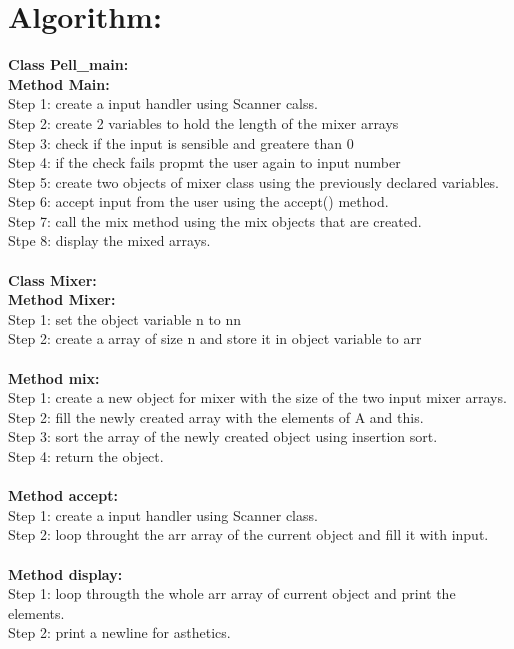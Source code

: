 \section*{Algorithm:}
\textbf{\color{javapurple}Class Pell\_main:}\\
\textbf{Method Main:}\\
Step 1: create a input handler using Scanner calss.\\
Step 2: create 2 variables to hold the length of the mixer arrays\\
Step 3: check if the input is sensible and greatere than 0\\
Step 4: if the check fails propmt the user again to input number\\
Step 5: create two objects of mixer class using the previously declared variables.\\
Step 6: accept input from the user using the accept() method.\\
Step 7: call the mix method using the mix objects that are created.\\
Stpe 8: display the mixed arrays.\\\\
\textbf{\color{javapurple}Class Mixer:}\\
\textbf{Method Mixer:}\\
Step 1: set the object variable n to nn \\
Step 2: create a array of size n and store it in object variable to arr\\\\
\textbf{Method mix:}\\
Step 1: create a new object for mixer with the size of the two input mixer arrays.\\
Step 2: fill the newly created array with the elements of A and this.\\
Step 3: sort the array of the newly created object using insertion sort.\\
Step 4: return the object.\\\\
\textbf{Method accept:}\\
Step 1: create a input handler using Scanner class.\\
Step 2: loop throught the arr array of the current object and fill it with input.\\\\
\textbf{Method display:}\\
Step 1: loop througth the whole arr array of current object and print the elements.\\
Step 2: print a newline for asthetics.\\\\

